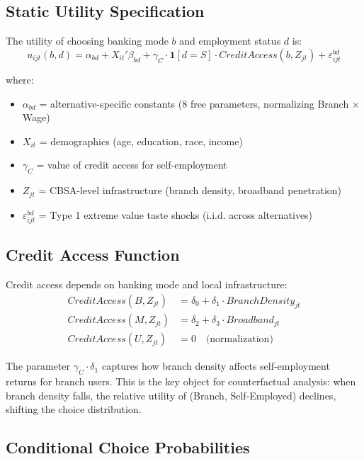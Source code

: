 \documentclass[12pt]{article}
\begin{document}
\subsection{Static Utility Specification}

The utility of choosing banking mode $b$ and employment status $d$ is:
\begin{equation}
u_{ijt}(b,d) = \alpha_{bd} + X_{it}'\beta_{bd} + \gamma_C \cdot \mathbf{1}[d = S] \cdot CreditAccess(b, Z_{jt}) + \varepsilon_{ijt}^{bd}
\end{equation}

where:
\begin{itemize}
    \item $\alpha_{bd}$ = alternative-specific constants (8 free parameters, normalizing Branch $\times$ Wage)
    \item $X_{it}$ = demographics (age, education, race, income)
    \item $\gamma_C$ = value of credit access for self-employment
    \item $Z_{jt}$ = CBSA-level infrastructure (branch density, broadband penetration)
    \item $\varepsilon_{ijt}^{bd}$ = Type 1 extreme value taste shocks (i.i.d. across alternatives)
\end{itemize}

\subsection{Credit Access Function}

Credit access depends on banking mode and local infrastructure:
\begin{align}
CreditAccess(B, Z_{jt}) &= \delta_0 + \delta_1 \cdot BranchDensity_{jt} \\
CreditAccess(M, Z_{jt}) &= \delta_2 + \delta_3 \cdot Broadband_{jt} \\
CreditAccess(U, Z_{jt}) &= 0 \quad \text{(normalization)}
\end{align}

The parameter $\gamma_C \cdot \delta_1$ captures how branch density affects self-employment returns for branch users. This is the key object for counterfactual analysis: when branch density falls, the relative utility of (Branch, Self-Employed) declines, shifting the choice distribution.

\subsection{Conditional Choice Probabilities}
\end{document}
